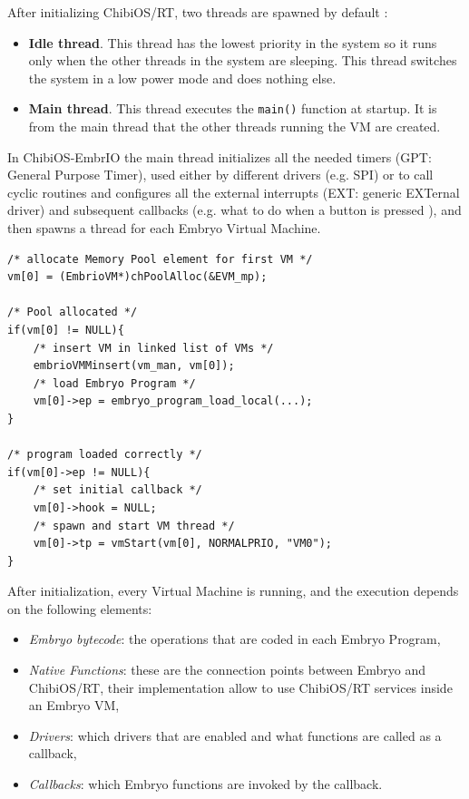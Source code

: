\documentclass[a4paper,10pt]{article}
\begin{document}
\begin{multicols}{2}
After initializing ChibiOS/RT, two threads are spawned by default \cite{chThd}:
\begin{itemize}
\item \textbf{Idle thread}. This thread has the lowest priority in the system so it runs only when the other threads in the system are sleeping. This thread switches the system in a low power mode and does nothing else.
\item \textbf{Main thread}. This thread executes the \texttt{main()} function at startup. It is from the main thread that the other threads running the VM are created.
\end{itemize}

In ChibiOS-EmbrIO the main thread initializes all the needed timers (GPT: General Purpose Timer), used either by different drivers (e.g. SPI) or to call cyclic routines and configures all the external interrupts (EXT: generic EXTernal driver) and subsequent callbacks (e.g. what to do when a button is pressed ), and then spawns a thread for each Embryo Virtual Machine.
\bigskip
\begin{lstlisting}[caption={EmbrIO VM start}]
/* allocate Memory Pool element for first VM */
vm[0] = (EmbrioVM*)chPoolAlloc(&EVM_mp);

/* Pool allocated */
if(vm[0] != NULL){
	/* insert VM in linked list of VMs */
	embrioVMMinsert(vm_man, vm[0]);
	/* load Embryo Program */
	vm[0]->ep = embryo_program_load_local(...);
}

/* program loaded correctly */
if(vm[0]->ep != NULL){
	/* set initial callback */
	vm[0]->hook = NULL;
	/* spawn and start VM thread */
	vm[0]->tp = vmStart(vm[0], NORMALPRIO, "VM0");
}
\end{lstlisting}
\medskip
After initialization, every Virtual Machine is running, and the execution depends on the following elements:
\begin{itemize}
\item \textit{Embryo bytecode}: the operations that are coded in each Embryo Program,
\item \textit{Native Functions}: these are the connection points between Embryo and ChibiOS/RT, their implementation allow to use ChibiOS/RT services inside an Embryo VM,
\item \textit{Drivers}: which drivers that are enabled and what functions are called as a callback,
\item \textit{Callbacks}: which Embryo functions are invoked by the callback.
\end{itemize}


\end{multicols}
\end{document}
